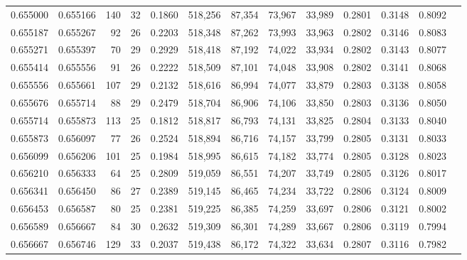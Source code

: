 \begin{tabular}{rrrrrrrrrrrrr}
0.655000 & 0.655166 &    140 &    32 &                                     0.1860 & 518,256 &  87,354 &  73,967 &  33,989 & 0.2801 & 0.3148 & 0.8092 \\
0.655187 & 0.655267 &     92 &    26 &                                     0.2203 & 518,348 &  87,262 &  73,993 &  33,963 & 0.2802 & 0.3146 & 0.8083 \\
0.655271 & 0.655397 &     70 &    29 &                                     0.2929 & 518,418 &  87,192 &  74,022 &  33,934 & 0.2802 & 0.3143 & 0.8077 \\
0.655414 & 0.655556 &     91 &    26 &                                     0.2222 & 518,509 &  87,101 &  74,048 &  33,908 & 0.2802 & 0.3141 & 0.8068 \\
0.655556 & 0.655661 &    107 &    29 &                                     0.2132 & 518,616 &  86,994 &  74,077 &  33,879 & 0.2803 & 0.3138 & 0.8058 \\
0.655676 & 0.655714 &     88 &    29 &                                     0.2479 & 518,704 &  86,906 &  74,106 &  33,850 & 0.2803 & 0.3136 & 0.8050 \\
0.655714 & 0.655873 &    113 &    25 &                                     0.1812 & 518,817 &  86,793 &  74,131 &  33,825 & 0.2804 & 0.3133 & 0.8040 \\
0.655873 & 0.656097 &     77 &    26 &                                     0.2524 & 518,894 &  86,716 &  74,157 &  33,799 & 0.2805 & 0.3131 & 0.8033 \\
0.656099 & 0.656206 &    101 &    25 &                                     0.1984 & 518,995 &  86,615 &  74,182 &  33,774 & 0.2805 & 0.3128 & 0.8023 \\
0.656210 & 0.656333 &     64 &    25 &                                     0.2809 & 519,059 &  86,551 &  74,207 &  33,749 & 0.2805 & 0.3126 & 0.8017 \\
0.656341 & 0.656450 &     86 &    27 &                                     0.2389 & 519,145 &  86,465 &  74,234 &  33,722 & 0.2806 & 0.3124 & 0.8009 \\
0.656453 & 0.656587 &     80 &    25 &                                     0.2381 & 519,225 &  86,385 &  74,259 &  33,697 & 0.2806 & 0.3121 & 0.8002 \\
0.656589 & 0.656667 &     84 &    30 &                                     0.2632 & 519,309 &  86,301 &  74,289 &  33,667 & 0.2806 & 0.3119 & 0.7994 \\
0.656667 & 0.656746 &    129 &    33 &                                     0.2037 & 519,438 &  86,172 &  74,322 &  33,634 & 0.2807 & 0.3116 & 0.7982 \\

\end{tabular}
